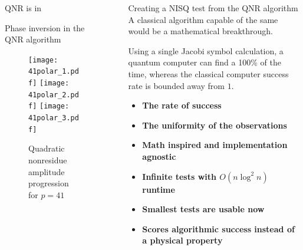 \documentclass[final]{beamer}
\providecommand{\QNR}{\csword{QNR}}
\newlength{\sepwidth}
\newlength{\colwidth}
\newcommand{\separatorcolumn}{\begin{column}{\sepwidth}\end{column}}
\begin{document}
\begin{frame}[t]
\begin{columns}[t]
\begin{column}{\colwidth}
\begin{exampleblock}{QNR is in \EQPC}
  \end{exampleblock}
  \begin{block}{Phase inversion in the QNR algorithm}
      \centering
    \begin{figure}
      \texttt{[image: 41polar\_1.pdf]}
    \hfill\texttt{[image: 41polar\_2.pdf]}
    \hfill\texttt{[image: 41polar\_3.pdf]}
      \caption{Quadratic nonresidue amplitude progression for $p=41$}
    \end{figure}

  \end{block}

\end{column}

\separatorcolumn

\begin{column}{\colwidth}

  \begin{exampleblock}{Creating a NISQ test from the QNR algorithm}
    A classical algorithm capable of the same would be a mathematical breakthrough.

    Using a single Jacobi symbol calculation, a quantum computer can find a \QNR 100\% of the time, 
    whereas the classical computer success rate is bounded away from $1$. %


    \begin{itemize}
      \item {\bf The rate of success}
      \item {\bf The uniformity of the observations}
    \end{itemize}

\begin{itemize}
  \item {\bf Math inspired and implementation agnostic}
  \item {\bf Infinite tests with $O(n \log^2 n)$ runtime} 
  \item {\bf Smallest tests are usable now}
  \item {\bf Scores algorithmic success instead of a physical property}
\end{itemize}
  \end{exampleblock}


\end{column}
\end{columns}
\end{frame}
\end{document}

